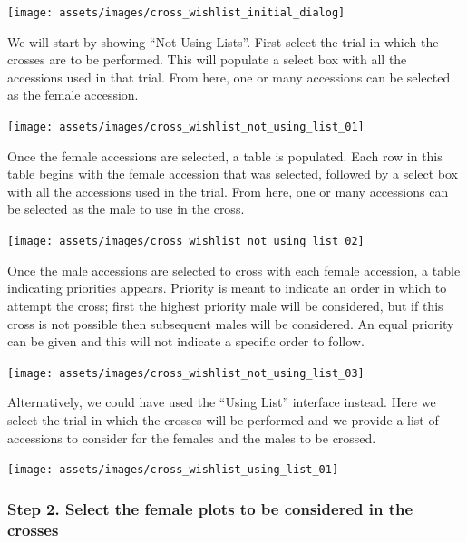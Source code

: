 \documentclass[
  12pt,
]{book}
\begin{document}
\begin{center}\texttt{[image: assets/images/cross\_wishlist\_initial\_dialog]} \end{center}

We will start by showing ``Not Using Lists''. First select the trial in which the crosses are to be performed. This will populate a select box with all the accessions used in that trial. From here, one or many accessions can be selected as the female accession.

\begin{center}\texttt{[image: assets/images/cross\_wishlist\_not\_using\_list\_01]} \end{center}

Once the female accessions are selected, a table is populated. Each row in this table begins with the female accession that was selected, followed by a select box with all the accessions used in the trial. From here, one or many accessions can be selected as the male to use in the cross.

\begin{center}\texttt{[image: assets/images/cross\_wishlist\_not\_using\_list\_02]} \end{center}

Once the male accessions are selected to cross with each female accession, a table indicating priorities appears. Priority is meant to indicate an order in which to attempt the cross; first the highest priority male will be considered, but if this cross is not possible then subsequent males will be considered. An equal priority can be given and this will not indicate a specific order to follow.

\begin{center}\texttt{[image: assets/images/cross\_wishlist\_not\_using\_list\_03]} \end{center}

Alternatively, we could have used the ``Using List'' interface instead. Here we select the trial in which the crosses will be performed and we provide a list of accessions to consider for the females and the males to be crossed.

\begin{center}\texttt{[image: assets/images/cross\_wishlist\_using\_list\_01]} \end{center}

\hypertarget{step-2.-select-the-female-plots-to-be-considered-in-the-crosses}{%
\subsubsection*{Step 2. Select the female plots to be considered in the crosses}\label{step-2.-select-the-female-plots-to-be-considered-in-the-crosses}}
\end{document}
